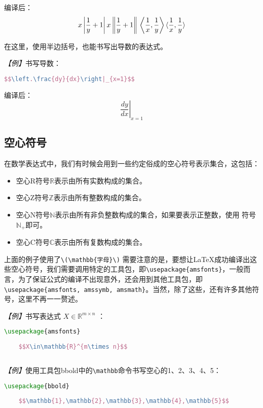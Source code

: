 编译后：
\begin{equation}
    x\left|\frac{1}{y}+1\right| \\
    x\left\|\frac{1}{y}+1\right\| \\
    \left<\frac{1}{x},\frac{1}{y}\right> \\
    \langle\frac{1}{x},\frac{1}{y}\rangle
\end{equation}

在这里，使用半边括号，也能书写出导数的表达式。

\emph{【例】}书写导数：
\begin{lstlisting}[language=TeX]
    $$\left.\frac{dy}{dx}\right|_{x=1}$$
\end{lstlisting}

编译后：
$$\left.\frac{dy}{dx}\right|_{x=1}$$

\subsection{空心符号}
在数学表达式中，我们有时候会用到一些约定俗成的空心符号表示集合，这包括：
\begin{itemize}
    \item 空心R符号\(\mathbb{R}\)表示由所有实数构成的集合。
    \item 空心Z符号\(\mathbb{Z}\)表示由所有整数构成的集合。
    \item 空心N符号\(\mathbb{N}\)表示由所有非负整数构成的集合，如果要表示正整数，使用
          符号\(\mathbb{N}_{+}\)即可。
    \item 空心C符号\(\mathbb{C}\)表示由所有复数构成的集合。
\end{itemize}

上面的例子使用了\texttt{\textbackslash{}(\textbackslash{}mathbb\{字母\}\textbackslash{})}
需要注意的是，要想让LaTeX成功编译出这些空心符号，我们需要调用特定的工具包，即\texttt{\textbackslash{}usepackage\{amsfonts\}}，一般而言，为了保证公式的编译不出现意外，还会用到其他工具包，即\texttt{\textbackslash{}usepackage\{amsfonts,\ amssymb,\ amsmath\}}。当然，除了这些，还有许多其他符号，这里不再一一赘述。

\emph{【例】}书写表达式 $X\in\mathbb{R}^{m\times n}$ ：
\begin{lstlisting}[language=TeX]
    \usepackage{amsfonts}
    
    $$X\in\mathbb{R}^{m\times n}$$
    
\end{lstlisting}

\emph{【例】}使用工具包bbold中的\texttt{\textbackslash{}mathbb}命令书写空心的1、2、3、4、5：
\begin{lstlisting}[language=TeX]
    \usepackage{bbold}
    
    $$\mathbb{1},\mathbb{2},\mathbb{3},\mathbb{4},\mathbb{5}$$
    
\end{lstlisting}

